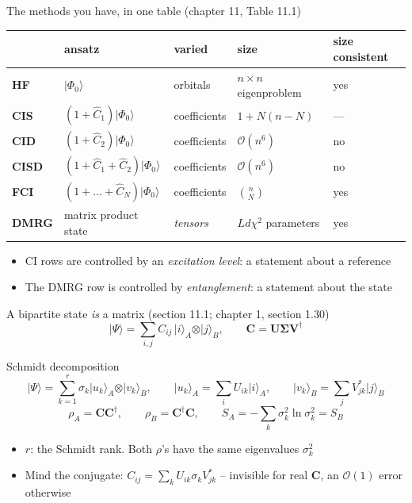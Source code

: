 \documentclass[aspectratio=169,10pt]{beamer}
\newcommand{\ket}[1]{\vert #1\rangle}
\newcommand{\bigO}{\mathcal{O}}
\newcommand{\bmat}[1]{\bm{#1}}
\begin{document}
\begin{frame}{The methods you have, in one table (chapter 11, Table 11.1)}
  \small
  \begin{center}
  \begin{tabular}{@{}lllll@{}}\toprule
   & ansatz & varied & size & size consistent\\\midrule
  \textbf{HF} & $\ket{\Phi_0}$ & orbitals & $n\times n$ eigenproblem & yes\\
  \textbf{CIS} & $(1+\hat C_1)\ket{\Phi_0}$ & coefficients & $1+N(n-N)$ & ---\\
  \textbf{CID} & $(1+\hat C_2)\ket{\Phi_0}$ & coefficients & $\bigO(n^6)$ & no\\
  \textbf{CISD} & $(1+\hat C_1+\hat C_2)\ket{\Phi_0}$ & coefficients & $\bigO(n^6)$ & no\\
  \textbf{FCI} & $(1+\dots+\hat C_N)\ket{\Phi_0}$ & coefficients & $\binom nN$ & yes\\
  \textbf{DMRG} & matrix product state & \emph{tensors} & $Ld\chi^2$ parameters & yes\\\bottomrule
  \end{tabular}
  \end{center}
  \vspace{0.8em}
  \begin{itemize}
    \item CI rows are controlled by an \emph{excitation level}: a statement about a reference
    \item The DMRG row is controlled by \emph{entanglement}: a statement about the state
  \end{itemize}
\end{frame}

\begin{frame}{A bipartite state \emph{is} a matrix (section 11.1; chapter 1, section 1.30)}
  \[
    \ket\Psi=\sum_{i,j}C_{ij}\,\ket i_A\otimes\ket j_B,
    \qquad
    \bmat C=\bmat U\bm\Sigma\bmat V^{\dagger}
  \]
  \begin{block}{Schmidt decomposition}
    \[
      \ket\Psi=\sum_{k=1}^{r}\sigma_k\ket{u_k}_A\otimes\ket{v_k}_B,
      \qquad
      \ket{u_k}_A=\sum_iU_{ik}\ket i_A,
      \qquad
      \ket{v_k}_B=\sum_jV^{*}_{jk}\ket j_B
    \]
    \[
      \rho_A=\bmat C\bmat C^{\dagger},\qquad
      \rho_B=\bmat C^{\dagger}\bmat C,\qquad
      S_A=-\sum_k\sigma_k^2\ln\sigma_k^2=S_B
    \]
  \end{block}
  \begin{itemize}
    \item $r$: the Schmidt rank. Both $\rho$'s have the same eigenvalues $\sigma_k^2$
    \item \alert{Mind the conjugate:} $C_{ij}=\sum_kU_{ik}\sigma_kV^{*}_{jk}$ -- invisible for real $\bmat C$, an $\bigO(1)$ error otherwise
  \end{itemize}
\end{frame}
\end{document}
